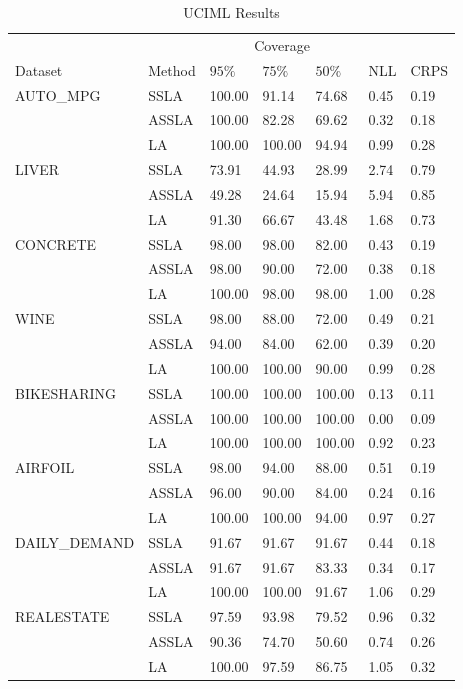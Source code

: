 \begin{table}
\centering
\begin{tabular}{lllllll}
  &  & \multicolumn{3}{c}{Coverage} & \multicolumn{2}{c}{} \\ 
\cline{3-5} 
Dataset & Method & $95\%$ & $75\%$ & $50\%$ & NLL & CRPS \\\hline
 \multirow{3}{*}{AUTO_MPG} & SSLA & 100.00 & 91.14 & 74.68 & 0.45 & 0.19 \\
 & ASSLA & 100.00 & 82.28 & 69.62 & 0.32 & 0.18 \\
 & LA & 100.00 & 100.00 & 94.94 & 0.99 & 0.28 \\\hline
\multirow{3}{*}{LIVER} & SSLA & 73.91 & 44.93 & 28.99 & 2.74 & 0.79 \\
 & ASSLA & 49.28 & 24.64 & 15.94 & 5.94 & 0.85 \\
 & LA & 91.30 & 66.67 & 43.48 & 1.68 & 0.73 \\\hline
\multirow{3}{*}{CONCRETE} & SSLA & 98.00 & 98.00 & 82.00 & 0.43 & 0.19 \\
 & ASSLA & 98.00 & 90.00 & 72.00 & 0.38 & 0.18 \\
 & LA & 100.00 & 98.00 & 98.00 & 1.00 & 0.28 \\\hline
\multirow{3}{*}{WINE} & SSLA & 98.00 & 88.00 & 72.00 & 0.49 & 0.21 \\
 & ASSLA & 94.00 & 84.00 & 62.00 & 0.39 & 0.20 \\
 & LA & 100.00 & 100.00 & 90.00 & 0.99 & 0.28 \\\hline
\multirow{3}{*}{BIKESHARING} & SSLA & 100.00 & 100.00 & 100.00 & 0.13 & 0.11 \\
 & ASSLA & 100.00 & 100.00 & 100.00 & 0.00 & 0.09 \\
 & LA & 100.00 & 100.00 & 100.00 & 0.92 & 0.23 \\\hline
\multirow{3}{*}{AIRFOIL} & SSLA & 98.00 & 94.00 & 88.00 & 0.51 & 0.19 \\
 & ASSLA & 96.00 & 90.00 & 84.00 & 0.24 & 0.16 \\
 & LA & 100.00 & 100.00 & 94.00 & 0.97 & 0.27 \\\hline
\multirow{3}{*}{DAILY_DEMAND} & SSLA & 91.67 & 91.67 & 91.67 & 0.44 & 0.18 \\
 & ASSLA & 91.67 & 91.67 & 83.33 & 0.34 & 0.17 \\
 & LA & 100.00 & 100.00 & 91.67 & 1.06 & 0.29 \\\hline
\multirow{3}{*}{REALESTATE} & SSLA & 97.59 & 93.98 & 79.52 & 0.96 & 0.32 \\
 & ASSLA & 90.36 & 74.70 & 50.60 & 0.74 & 0.26 \\
 & LA & 100.00 & 97.59 & 86.75 & 1.05 & 0.32 \\\hline 
\end{tabular}
\caption{UCIML Results}
\label{tab:uciml_results}
\end{table}